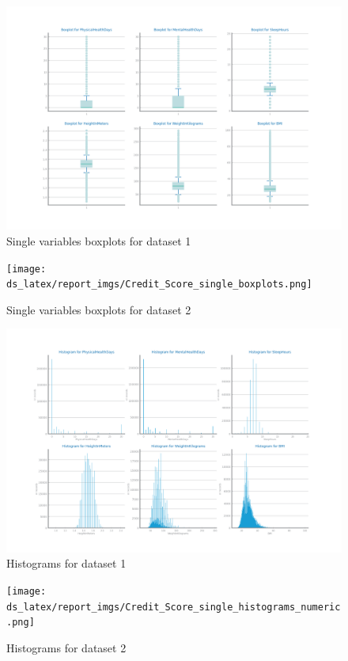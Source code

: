\documentclass[10pt]{extarticle}
\begin{document}
\begin{figure}[H]
\centering\includegraphics[scale=0.60]{images/dataset1/data_profiling/CovidPos_single_boxplots.png}
\caption{Single variables boxplots for dataset 1}
\end{figure}

\begin{figure}[H]
\centering\texttt{[image: ds\_latex/report\_imgs/Credit\_Score\_single\_boxplots.png]}
\caption{Single variables boxplots for dataset 2}
\end{figure}

\begin{figure}[H]
\centering\includegraphics[scale=0.6]{images/dataset1/data_profiling/CovidPos_single_histograms_numeric.png}
\caption{Histograms for dataset 1} %
\end{figure}

\begin{figure}[H]
\centering\texttt{[image: ds\_latex/report\_imgs/Credit\_Score\_single\_histograms\_numeric.png]}
\caption{Histograms for dataset 2} %
\end{figure}
\end{document}
